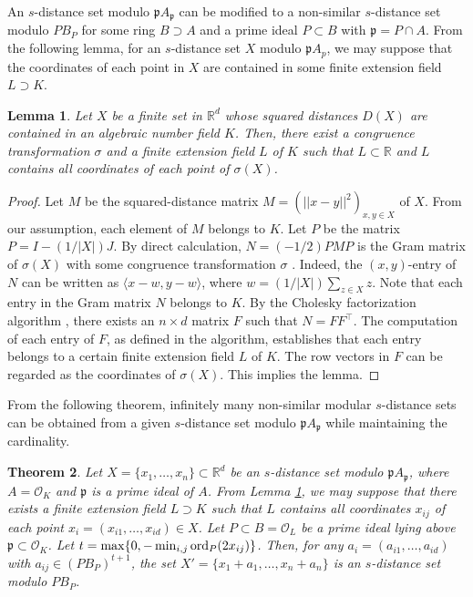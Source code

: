 \documentclass[a4paper, 11pt]{article}
\newcommand{\R}{\mathbb{R}}
\newcommand{\p}{\mathfrak{p}}
\newcommand{\Oc}{\mathcal{O}}
\newtheorem{theorem}{Theorem}[section]
\newtheorem{lemma}[theorem]{Lemma}
\theoremstyle{definition}
\begin{document}
An $s$-distance set modulo $\p A_\p$ can be modified to a non-similar $s$-distance set modulo $PB_P$ for some ring $B\supset A$ and a prime ideal $P\subset B$ with $\p=P\cap A$. 
From the following lemma, for an $s$-distance set $X$ modulo $\p A_p$, 
we may suppose that the coordinates of each point in $X$ are contained in some finite extension field $L \supset K$. 
\begin{lemma} \label{lem:L}
Let $X$ be a finite set in $\R^d$ whose squared distances $D(X)$ are contained in an algebraic number field $K$.
Then, there exist a congruence transformation $\sigma$ and a finite extension field $L$ of $K$ such that $L \subset \R$ and $L$ contains all coordinates of each point of $\sigma(X)$. 
\end{lemma}
\begin{proof}
Let $M$ be the squared-distance matrix $M=(||x-y||^2)_{x,y\in X}$ of $X$. 
From our assumption, each element of $M$ belongs to $K$. Let $P$ be the matrix $P=I-(1/|X|) J$. 
By direct calculation, $N=(-1/2)PMP$ is the Gram matrix of $\sigma(X)$ with some congruence transformation $\sigma$ \cite{N81}. 
Indeed, the $(x,y)$-entry of $N$ can be written as 
$\langle x-w,y-w\rangle$, where $w=(1/|X|)\sum_{z \in X}z$.  
Note that each entry in the Gram matrix $N$ belongs to $K$.  
By the Cholesky factorization algorithm \cite[Theorem 10.9]{Hb}, there exists an $n\times d$ matrix $F$ such that $N =FF^\top$. 
The computation of each entry of $F$, as defined in the algorithm, establishes that each entry belongs to a certain finite extension field $L$ of $K$. The row vectors in $F$ can be regarded as the coordinates of $\sigma(X)$. 
This implies the lemma. 
\end{proof}
From the following theorem, 
infinitely many non-similar modular $s$-distance sets can be obtained from a given $s$-distance set modulo $\p A_\p$ while maintaining the cardinality.  
\begin{theorem} \label{thm:make_ex}
Let $X=\{x_1,\ldots, x_n\} \subset \mathbb{R}^d$ be an $s$-distance set modulo $\p A_\p$, where $A=\Oc_K$ and $\p$ is a prime ideal of $A$. 
From Lemma \ref{lem:L}, we may suppose that  there exists a finite extension field $L\supset K$ such that   $L$ contains all coordinates $x_{ij}$ of each point $x_i=(x_{i1},\ldots, x_{id})\in X$. 
Let $P\subset B=\Oc_L$ be a prime ideal lying above $\p\subset \Oc_K$. 
Let $t=\max\{0,-\min_{i,j}{\rm ord}_{P}(2x_{ij})\}$. Then, 
for any $a_i=(a_{i1},\ldots, a_{id})$ with $a_{ij} \in (PB_P)^{t+1}$, the set $X'=\{x_1+a_1,\ldots,x_n+a_n\}$ is 
an $s$-distance set modulo $P B_P$. 
\end{theorem}
\end{document}
